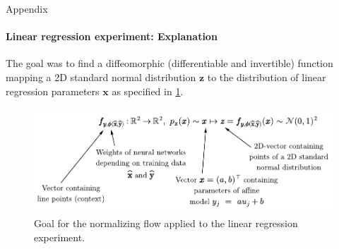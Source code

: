 \documentclass{beamer}
\newcommand\vect[1]{\ensuremath{\bm{#1}}}
\begin{document}
\begin{frame}[allowframebreaks]{Appendix}
	\framesubtitle{Linear regression experiment: Explanation}
	The goal was to find a diffeomorphic (differentiable and invertible) function mapping a 2D standard normal distribution $\vect{z}$ to the distribution of linear regression parameters $\vect{x}$ as specified in \cref{fig:linearregressiongoal}.
	\begin{figure}[h]
		\centering
		\includegraphics[width=\textwidth]{figures/presentation/linearregression.pdf}
		\caption{Goal for the normalizing flow applied to the linear regression experiment.}
		\label{fig:linearregressiongoal}
	\end{figure}
\end{frame}
\end{document}
